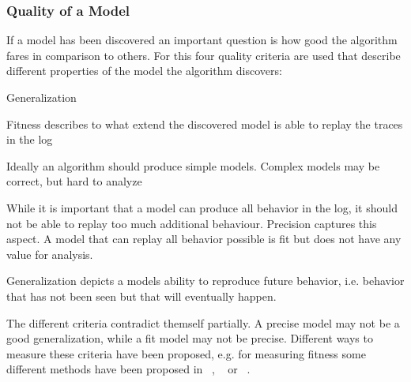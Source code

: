 \documentclass[
	a4paper,
	pagesize,
	pdftex,
	12pt,
	twoside, %
	BCOR=5mm, %
	ngerman,
	fleqn,
	final,
	]{scrartcl}
\begin{document}
\subsubsection{Quality of a Model}
If a model has been discovered an important question is how good the algorithm fares in comparison to others. For this four quality criteria are used that describe different properties of the model the algorithm discovers:
\begin{labeling}{Generalization}
\item [Fitness] Fitness describes to what extend the discovered model is able to replay the traces in the log
\item [Simplicity] Ideally an algorithm should produce simple models. Complex models may be correct, but hard to analyze
\item [Precision] While it is important that a model can produce all behavior in the log, it should not be able to replay too much additional behaviour. Precision captures this aspect. A model that can replay all behavior possible is fit but does not have any value for analysis.
\item [Generalization] Generalization depicts a models ability to reproduce future behavior, i.e. behavior that has not been seen but that will eventually happen.
\end{labeling}

The different criteria contradict themself partially. A precise model may not be a good generalization, while a fit model may not be precise. Different ways to measure these criteria have been proposed, e.g. for measuring fitness some different methods have been proposed in ~\cite{Quality}, ~\cite{Fitnes2} or ~\cite{UsedFitnes}.
\end{document}
